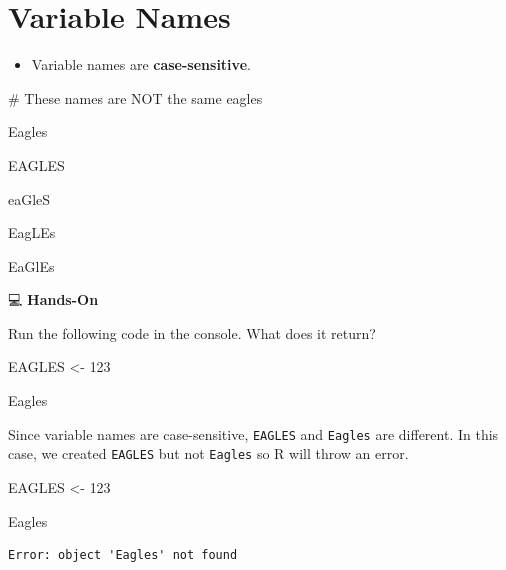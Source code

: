 \documentclass[
  letterpaper,
  DIV=11,
  numbers=noendperiod]{scrreprt}
\newenvironment{Shaded}{\begin{snugshade}}{\end{snugshade}}
\newcommand{\CommentTok}[1]{\textcolor[rgb]{0.37,0.37,0.37}{#1}}
\newcommand{\DecValTok}[1]{\textcolor[rgb]{0.68,0.00,0.00}{#1}}
\newcommand{\NormalTok}[1]{\textcolor[rgb]{0.00,0.23,0.31}{#1}}
\newcommand{\OtherTok}[1]{\textcolor[rgb]{0.00,0.23,0.31}{#1}}
\providecommand{\tightlist}{%
  \setlength{\itemsep}{0pt}\setlength{\parskip}{0pt}}\usepackage{longtable,booktabs,array}
\begin{document}
\section{Variable Names}\label{variable-names}

\begin{itemize}
\tightlist
\item
  Variable names are \textbf{case-sensitive}.
\end{itemize}

\begin{Shaded}
\begin{Highlighting}[]
\CommentTok{\# These names are NOT the same}
\NormalTok{eagles}

\NormalTok{Eagles}

\NormalTok{EAGLES}

\NormalTok{eaGleS}

\NormalTok{EagLEs}

\NormalTok{EaGlEs}
\end{Highlighting}
\end{Shaded}

💻 \textbf{Hands-On}

Run the following code in the console. What does it return?

\begin{Shaded}
\begin{Highlighting}[]
\NormalTok{EAGLES }\OtherTok{\textless{}{-}} \DecValTok{123}

\NormalTok{Eagles}
\end{Highlighting}
\end{Shaded}

\begin{tcolorbox}[enhanced jigsaw, colbacktitle=quarto-callout-tip-color!10!white, opacitybacktitle=0.6, breakable, left=2mm, leftrule=.75mm, toprule=.15mm, toptitle=1mm, bottomtitle=1mm, colframe=quarto-callout-tip-color-frame, opacityback=0, coltitle=black, arc=.35mm, titlerule=0mm, colback=white, bottomrule=.15mm, title=\textcolor{quarto-callout-tip-color}{\faLightbulb}\hspace{0.5em}{Answer}, rightrule=.15mm]

Since variable names are case-sensitive, \texttt{EAGLES} and
\texttt{Eagles} are different. In this case, we created \texttt{EAGLES}
but not \texttt{Eagles} so R will throw an error.

\begin{Shaded}
\begin{Highlighting}[]
\NormalTok{EAGLES }\OtherTok{\textless{}{-}} \DecValTok{123}

\NormalTok{Eagles}
\end{Highlighting}
\end{Shaded}

\begin{verbatim}
Error: object 'Eagles' not found
\end{verbatim}

\end{tcolorbox}
\end{document}
